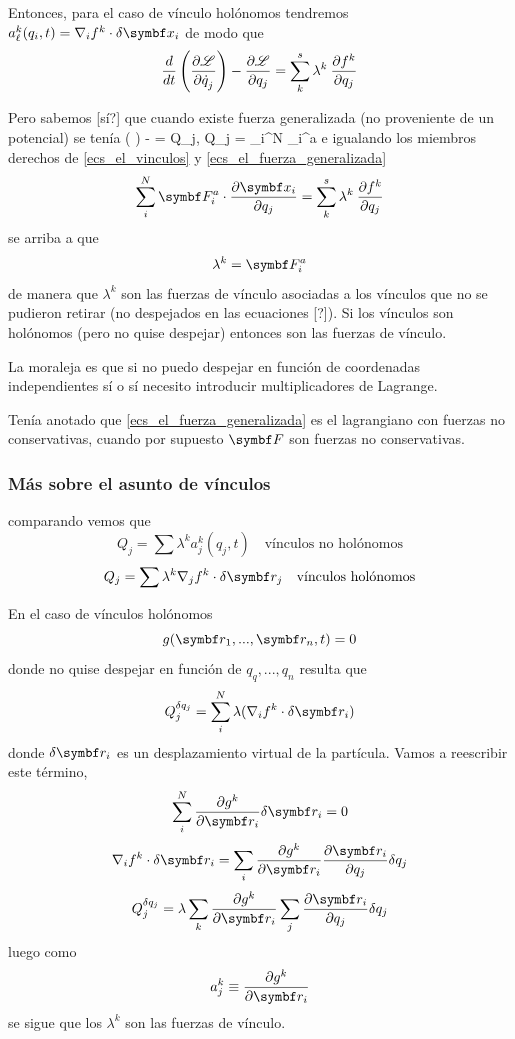 \documentclass[10pt,oneside]{CBFT_book}
\begin{document}
Entonces, para el caso de vínculo holónomos tendremos $ a^k_\ell(q_i,t) = \nabla_i f^k \cdot \delta \vb{x}_i $ de modo que
\[
	\frac{d}{dt}\left( \frac{\partial^{\hspace{-0.05em}} {\mathscr{L}}}{\partial {\dot{q}_j}^{\hspace{-0.05em}}} \right) -\frac{\partial^{\hspace{-0.05em}} {\mathscr{L}}}{\partial {q_j}^{\hspace{-0.05em}}} =
	\sum_{k}^s \lambda^k \: \frac{\partial^{\hspace{-0.05em}} {f^k}}{\partial {q_j}^{\hspace{-0.05em}}}
	\label{ecs_el_vinculos}
\]

Pero sabemos [sí?] que cuando existe fuerza generalizada (no proveniente de un potencial) se tenía 
\be
	\left(  \right) - = Q_j, \qquad \qquad 
	Q_j = \sum_i^N _i^a \cdot {}
	\label{ecs_el_fuerza_generalizada}
\ee
e igualando los miembros derechos de \eqref{ecs_el_vinculos} y \eqref{ecs_el_fuerza_generalizada} 
\[
	\sum_i^N \vb{F}_i^a \cdot \dpar{\vb{x}_i}{q_j} = \sum_{k}^s \lambda^k \: \dpar{f^k}{q_j}
\]
se arriba a que 
\[
	\lambda^k = \vb{F}_i^a 
\]
de manera que $\lambda^k$ son las fuerzas de vínculo asociadas a los vínculos que no se pudieron retirar
(no despejados en las ecuaciones [?]).
Si los vínculos son holónomos (pero no quise despejar) entonces son las fuerzas de vínculo.

La moraleja es que si no puedo despejar en función de coordenadas independientes sí o sí necesito introducir
multiplicadores de Lagrange.

Tenía anotado que \eqref{ecs_el_fuerza_generalizada} es el lagrangiano con fuerzas no conservativas, cuando por 
supuesto $\vb{F}$ son fuerzas no conservativas.


\subsubsection{Más sobre el asunto de vínculos}

comparando vemos que 
\[
	Q_j = \sum \lambda^k a^k_j(q_j,t) \quad \textrm{vínculos no holónomos}
\]
\[
	Q_j=  \sum \lambda^k \nabla_j f^k \cdot \delta \vb{r}_j  \quad \textrm{vínculos holónomos}
\]

En el caso de vínculos holónomos 
\[
	g(\vb{r}_1,...,\vb{r}_n,t) = 0 
\]
donde no quise despejar en función de $q_q,...,q_n$ resulta que 
\[
	Q_j^{\delta q_j} =  \sum_i^N \lambda (\nabla_i f^k\cdot\delta\vb{r}_i)
\]
donde $\delta\vb{r}_i$ es un desplazamiento virtual de la partícula.
Vamos a reescribir este término,
\[
	\sum_i^N \dpar{g^k}{\vb{r}_i} \delta \vb{r}_i = 0
\]
\[
	\nabla_i f^k\cdot\delta\vb{r}_i = \sum_i \dpar{g^k}{\vb{r}_i} \dpar{\vb{r}_i}{q_j} \delta q_j
\]
\[
	Q_j^{\delta q_j} =  \lambda \sum_k \dpar{g^k}{\vb{r}_i} \sum_j \dpar{\vb{r}_i}{q_j} \delta q_j
\]
luego como 
\[
	a^k_j \equiv \dpar{g^k}{\vb{r}_i}
\]
se sigue que los $\lambda^k$ son las fuerzas de vínculo.
\end{document}
